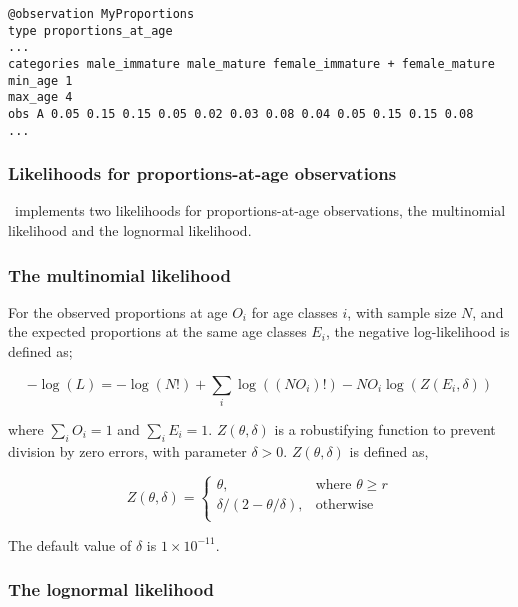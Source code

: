 {{{{{{{\small{\begin{verbatim}
@observation MyProportions
type proportions_at_age
...
categories male_immature male_mature female_immature + female_mature
min_age 1
max_age 4
obs A 0.05 0.15 0.15 0.05 0.02 0.03 0.08 0.04 0.05 0.15 0.15 0.08
...
\end{verbatim}}}

\subsubsection{Likelihoods for proportions-at-age observations}

\SPM\ implements two likelihoods for proportions-at-age observations, the multinomial likelihood and the lognormal likelihood. 

\subsubsection*{The multinomial likelihood}

For the observed proportions at age $O_i$ for age classes $i$, with sample size $N$, and the expected proportions at the same age classes $E_i$, the negative log-likelihood is defined as; 

\begin{equation}
  -\log \left(L \right) =  -\log \left(N! \right) + \sum\limits_i \log \left( \left(NO_i \right)! \right) - NO_i \log \left(Z \left(E_i,\delta \right) \right)
\end{equation}

where $\sum\limits_i O_i = 1$ and $\sum\limits_i E_i = 1$. $Z \left(\theta,\delta \right)$ is a robustifying function to prevent division by zero errors, with parameter $\delta>0$. $Z \left(\theta,\delta \right)$ is defined as,

\begin{equation}
   Z \left(\theta,\delta \right) = \begin{cases}
	  \theta, & \text{where $\theta \ge r$} \\
	  \delta/\left( 2-\theta/\delta \right), & \text{otherwise} \\  
  \end{cases}
\end{equation}

The default value of $\delta$ is $1 \times 10^{-11}$.

\subsubsection*{The lognormal likelihood}

}}}}}}
